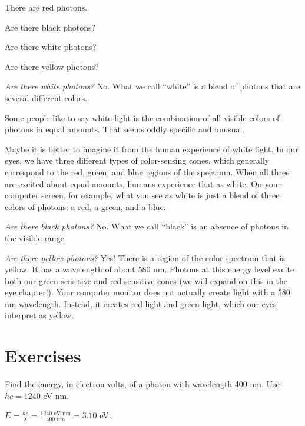 \begin{Exercise}[title={Photons and Color}, label=photon_color]

  There are red photons.

  Are there black photons?

  Are there white photons?

  Are there yellow photons?

\end{Exercise}
\begin{Answer}[ref=photon_color] \textit{Are there white photons?}  No. What we call ``white'' is a
  blend of photons that are several different colors.

  Some people like to say white light is the combination of all visible
  colors of photons in equal amounts. That seems oddly specific and unusual.

  Maybe it is better to imagine it from the human experience of white
  light. In our eyes, we have three different types of color-sensing
  cones, which generally correspond to the red, green, and
  blue regions of the spectrum. When all three are excited about equal
  amounts, humans experience that as white. On your computer screen,
  for example, what you see as white is just a blend of three colors of
  photons: a red, a green, and a blue.

  \textit{Are there black photons?}  No. What we call ``black'' is an
  absence of photons in the visible range.

  \textit{Are there yellow photons?} Yes! There is a region of the color
  spectrum that is yellow. It has a wavelength of about 580 nm. Photons
  at this energy level excite both our green-sensitive and red-sensitive
  cones (we will expand on this in the eye chapter!).
  Your computer monitor does not actually create light with a 580 nm
  wavelength. Instead, it creates red light and green light, which our
  eyes interpret as yellow.

\end{Answer}

\section{Exercises}

\begin{Exercise}[label=ph1, title={Energy of a photon}]
Find the energy, in electron volts, of a photon with wavelength 400 nm. Use $hc = 1240$ eV nm.
\end{Exercise}
\begin{Answer}[ref=ph1]
$E = \frac{hc}{\lambda} = \frac{1240 \text{ eV nm}}{400 \text{ nm}} = 3.10$ eV.
\end{Answer}

